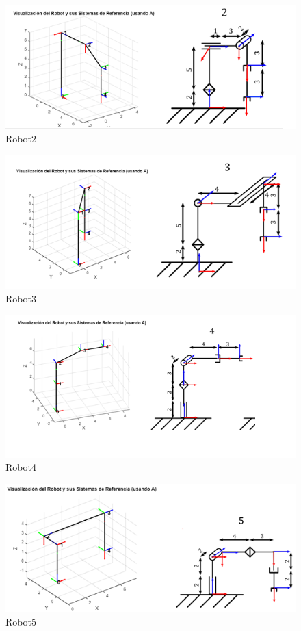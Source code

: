 
\begin{figure} [h]
	\centering
	\includegraphics[width=0.9\linewidth]{"../Ejercicios DH/img/robot2"}
	\caption{Robot2}
	\label{fig:robot2}
\end{figure}


\begin{figure} [h]
	\centering
	\includegraphics[width=0.9\linewidth]{"../Ejercicios DH/img/robot3"}
	\caption{Robot3}
	\label{fig:robot3}
\end{figure}


\begin{figure} [h]
	\centering
	\includegraphics[width=0.9\linewidth]{"../Ejercicios DH/img/robot4"}
	\caption{Robot4}
	\label{fig:robot4}
\end{figure}


\begin{figure} [h]
	\centering
	\includegraphics[width=0.9\linewidth]{"../Ejercicios DH/img/robot5"}
	\caption{Robot5}
	\label{fig:robot5}
\end{figure}


